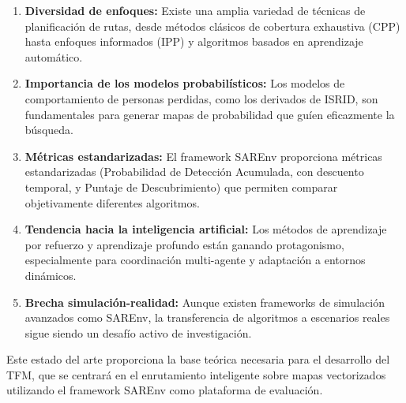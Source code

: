 \begin{enumerate}
	\item \textbf{Diversidad de enfoques:} Existe una amplia variedad de técnicas de planificación de rutas, desde métodos clásicos de cobertura exhaustiva (CPP) hasta enfoques informados (IPP) y algoritmos basados en aprendizaje automático.
	
	\item \textbf{Importancia de los modelos probabilísticos:} Los modelos de comportamiento de personas perdidas, como los derivados de ISRID, son fundamentales para generar mapas de probabilidad que guíen eficazmente la búsqueda.
	
	\item \textbf{Métricas estandarizadas:} El framework SAREnv proporciona métricas estandarizadas (Probabilidad de Detección Acumulada, con descuento temporal, y Puntaje de Descubrimiento) que permiten comparar objetivamente diferentes algoritmos.
	
	\item \textbf{Tendencia hacia la inteligencia artificial:} Los métodos de aprendizaje por refuerzo y aprendizaje profundo están ganando protagonismo, especialmente para coordinación multi-agente y adaptación a entornos dinámicos.
	
	\item \textbf{Brecha simulación-realidad:} Aunque existen frameworks de simulación avanzados como SAREnv, la transferencia de algoritmos a escenarios reales sigue siendo un desafío activo de investigación.
\end{enumerate}

Este estado del arte proporciona la base teórica necesaria para el desarrollo del TFM, que se centrará en el enrutamiento inteligente sobre mapas vectorizados utilizando el framework SAREnv como plataforma de evaluación.
